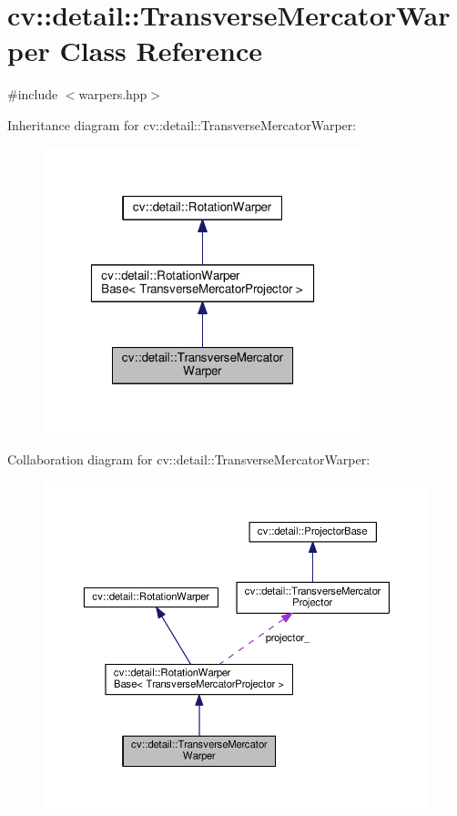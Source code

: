 \hypertarget{classcv_1_1detail_1_1TransverseMercatorWarper}{\section{cv\-:\-:detail\-:\-:Transverse\-Mercator\-Warper Class Reference}
\label{classcv_1_1detail_1_1TransverseMercatorWarper}
}


{\ttfamily \#include $<$warpers.\-hpp$>$}



Inheritance diagram for cv\-:\-:detail\-:\-:Transverse\-Mercator\-Warper\-:\nopagebreak
\begin{figure}[H]
\begin{center}
\leavevmode
\includegraphics[width=262pt]{classcv_1_1detail_1_1TransverseMercatorWarper__inherit__graph}
\end{center}
\end{figure}


Collaboration diagram for cv\-:\-:detail\-:\-:Transverse\-Mercator\-Warper\-:\nopagebreak
\begin{figure}[H]
\begin{center}
\leavevmode
\includegraphics[width=350pt]{classcv_1_1detail_1_1TransverseMercatorWarper__coll__graph}
\end{center}
\end{figure}
